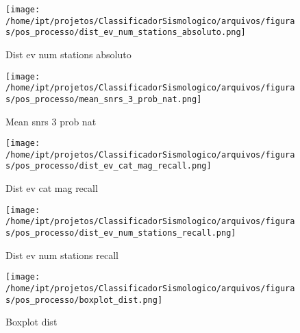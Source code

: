                     \begin{figure}[H]
                        \centering
                        \texttt{[image: /home/ipt/projetos/ClassificadorSismologico/arquivos/figuras/pos\_processo/dist\_ev\_num\_stations\_absoluto.png]}
                        \caption{Dist ev num stations absoluto}
                        \label{fig:dist_ev_num_stations_absoluto}
                    \end{figure}
                

                    \begin{figure}[H]
                        \centering
                        \texttt{[image: /home/ipt/projetos/ClassificadorSismologico/arquivos/figuras/pos\_processo/mean\_snrs\_3\_prob\_nat.png]}
                        \caption{Mean snrs 3 prob nat}
                        \label{fig:mean_snrs_3_prob_nat}
                    \end{figure}
                

                    \begin{figure}[H]
                        \centering
                        \texttt{[image: /home/ipt/projetos/ClassificadorSismologico/arquivos/figuras/pos\_processo/dist\_ev\_cat\_mag\_recall.png]}
                        \caption{Dist ev cat mag recall}
                        \label{fig:dist_ev_cat_mag_recall}
                    \end{figure}
                

                    \begin{figure}[H]
                        \centering
                        \texttt{[image: /home/ipt/projetos/ClassificadorSismologico/arquivos/figuras/pos\_processo/dist\_ev\_num\_stations\_recall.png]}
                        \caption{Dist ev num stations recall}
                        \label{fig:dist_ev_num_stations_recall}
                    \end{figure}
                

                    \begin{figure}[H]
                        \centering
                        \texttt{[image: /home/ipt/projetos/ClassificadorSismologico/arquivos/figuras/pos\_processo/boxplot\_dist.png]}
                        \caption{Boxplot dist}
                        \label{fig:boxplot_dist}
                    \end{figure}
                

